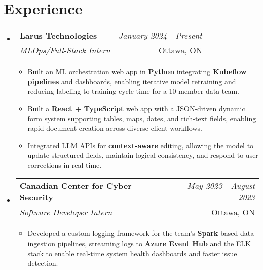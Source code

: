 \documentclass[a4paper,11pt]{article}
\makeatletter
\newcommand{\resumeSubheading}[4]{\vspace{0.5mm}\item\begin{tabular*}{0.98\textwidth}[t]{l@{\extracolsep{\fill}}r}\textbf{#1} & \textit{\footnotesize{#4}} \\\textit{\footnotesize{#3}} &  \footnotesize{#2}\\\end{tabular*}\vspace{-2.4mm}}
\newcommand{\resumeSubHeadingListStart}{\begin{itemize}[leftmargin=*,labelsep=0mm]}
\newcommand{\resumeItemListStart}{\begin{justify}\begin{itemize}[label=\textcolor{black}{--}, leftmargin=3ex, rightmargin=2ex, noitemsep,labelsep=1.2mm,itemsep=0mm]\small}
\newcommand{\resumeSubHeadingListEnd}{\end{itemize}\vspace{2mm}}
\newcommand{\resumeItemListEnd}{\end{itemize}\end{justify}\vspace{-2mm}}
\makeatother
\begin{document}
\section{\textbf{Experience}}
  \resumeSubHeadingListStart
    \resumeSubheading{Larus Technologies}{Ottawa, ON}{MLOps/Full-Stack Intern}{January 2024 - Present}
      \resumeItemListStart
        \item {Built an ML orchestration web app in \textbf{Python} integrating \textbf{Kubeflow pipelines} and dashboards, enabling iterative model retraining and reducing labeling-to-training cycle time for a 10-member data team.}
    \vspace{1mm}
    \item {Built a \textbf{React + TypeScript} web app with a JSON-driven dynamic form system supporting tables, maps, dates, and rich-text fields, enabling rapid document creation across diverse client workflows.}
    \vspace{1mm}
    \item {Integrated LLM APIs for \textbf{context-aware} editing, allowing the model to update structured fields, maintain logical consistency, and respond to user corrections in real time.}
      \resumeItemListEnd
      \vspace{-3mm}
    \resumeSubheading{Canadian Center for Cyber Security}{Ottawa, ON}{Software Developer Intern}{May 2023 - August 2023}
      \resumeItemListStart
        \item {Developed a custom logging framework for the team’s \textbf{Spark}-based data ingestion pipelines, streaming logs to \textbf{Azure Event Hub} and the ELK stack to enable real-time system health dashboards and faster issue detection.}
      \resumeItemListEnd
  \resumeSubHeadingListEnd
\vspace{-6mm}

\end{document}
